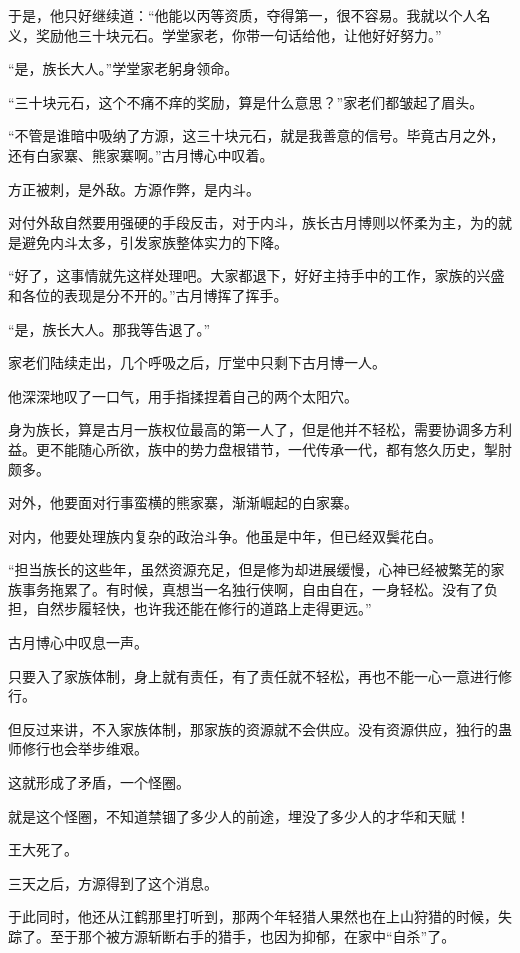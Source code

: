 \begin{this_body}
于是，他只好继续道：“他能以丙等资质，夺得第一，很不容易。我就以个人名义，奖励他三十块元石。学堂家老，你带一句话给他，让他好好努力。”

“是，族长大人。”学堂家老躬身领命。

“三十块元石，这个不痛不痒的奖励，算是什么意思？”家老们都皱起了眉头。

“不管是谁暗中吸纳了方源，这三十块元石，就是我善意的信号。毕竟古月之外，还有白家寨、熊家寨啊。”古月博心中叹着。

方正被刺，是外敌。方源作弊，是内斗。

对付外敌自然要用强硬的手段反击，对于内斗，族长古月博则以怀柔为主，为的就是避免内斗太多，引发家族整体实力的下降。

“好了，这事情就先这样处理吧。大家都退下，好好主持手中的工作，家族的兴盛和各位的表现是分不开的。”古月博挥了挥手。

“是，族长大人。那我等告退了。”

家老们陆续走出，几个呼吸之后，厅堂中只剩下古月博一人。

他深深地叹了一口气，用手指揉捏着自己的两个太阳穴。

身为族长，算是古月一族权位最高的第一人了，但是他并不轻松，需要协调多方利益。更不能随心所欲，族中的势力盘根错节，一代传承一代，都有悠久历史，掣肘颇多。

对外，他要面对行事蛮横的熊家寨，渐渐崛起的白家寨。

对内，他要处理族内复杂的政治斗争。他虽是中年，但已经双鬓花白。

“担当族长的这些年，虽然资源充足，但是修为却进展缓慢，心神已经被繁芜的家族事务拖累了。有时候，真想当一名独行侠啊，自由自在，一身轻松。没有了负担，自然步履轻快，也许我还能在修行的道路上走得更远。”

古月博心中叹息一声。

只要入了家族体制，身上就有责任，有了责任就不轻松，再也不能一心一意进行修行。

但反过来讲，不入家族体制，那家族的资源就不会供应。没有资源供应，独行的蛊师修行也会举步维艰。

这就形成了矛盾，一个怪圈。

就是这个怪圈，不知道禁锢了多少人的前途，埋没了多少人的才华和天赋！

王大死了。

三天之后，方源得到了这个消息。

于此同时，他还从江鹤那里打听到，那两个年轻猎人果然也在上山狩猎的时候，失踪了。至于那个被方源斩断右手的猎手，也因为抑郁，在家中“自杀”了。


\end{this_body}
